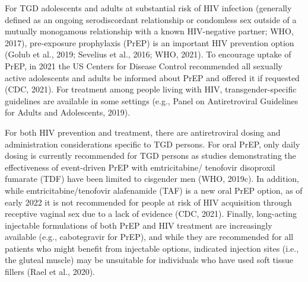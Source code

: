 \documentclass[
]{book}
\begin{document}
For TGD adolescents and adults at substantial
risk of HIV infection (generally defined as an
ongoing serodiscordant relationship or condomless sex outside of a mutually monogamous relationship with a known HIV-negative partner;
WHO, 2017), pre-exposure prophylaxis (PrEP) is
an important HIV prevention option (Golub
et al., 2019; Sevelius et al., 2016; WHO, 2021).
To encourage uptake of PrEP, in 2021 the US
Centers for Disease Control recommended all
sexually active adolescents and adults be informed
about PrEP and offered it if requested (CDC,
2021). For treatment among people living with
HIV, transgender-specific guidelines are available
in some settings (e.g., Panel on Antiretroviral
Guidelines for Adults and Adolescents, 2019).

For both HIV prevention and treatment, there
are antiretroviral dosing and administration considerations specific to TGD persons. For oral PrEP,
only daily dosing is currently recommended for
TGD persons as studies demonstrating the effectiveness of event-driven PrEP with emtricitabine/
tenofovir disoproxil fumarate (TDF) have been
limited to cisgender men (WHO, 2019c). In addition, while emtricitabine/tenofovir alafenamide
(TAF) is a new oral PrEP option, as of early 2022
it is not recommended for people at risk of HIV
acquisition through receptive vaginal sex due to a
lack of evidence (CDC, 2021). Finally, long-acting
injectable formulations of both PrEP and HIV
treatment are increasingly available (e.g., cabotegravir for PrEP), and while they are recommended
for all patients who might benefit from injectable
options, indicated injection sites (i.e., the gluteal
muscle) may be unsuitable for individuals who
have used soft tissue fillers (Rael et al., 2020).
\end{document}

